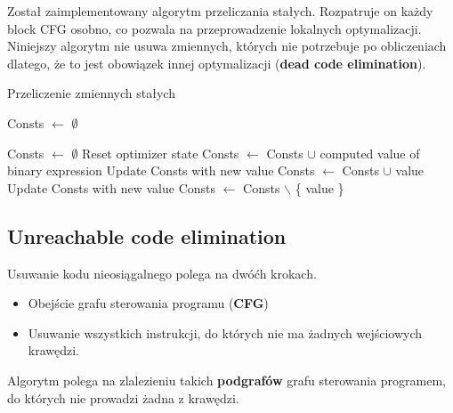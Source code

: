 \documentclass[leqno, 12pt]{article}
\newcommand{\spacing}{\vskip 0.5cm}
\begin{document}
			Został zaimplementowany algorytm przeliczania stałych. Rozpatruje on każdy block CFG osobno,
			co pozwala na przeprowadzenie lokalnych optymalizacji. Niniejszy algorytm nie usuwa zmiennych,
			których nie potrzebuje po obliczeniach dlatego, że to jest obowiązek innej optymalizacji
			(\textbf{dead code elimination}). 

			\spacing
		
			\begin{algorithm}
				\caption{Przeliczenie zmiennych stałych}
				\begin{algorithmic}[1]

					\State Consts $\gets$ $\emptyset$
					
							\State Consts $\gets$ $\emptyset$
							\Comment Reset optimizer state
						\EndIf
							\State Consts $\gets$ Consts $\cup$ computed value of binary expression
						\EndIf
									\State Update Consts with new value
								\Else
									\State Consts $\gets$ Consts $\cup$ value
								\EndIf
							\EndIf
									\State Update Consts with new value
								\Else
									\State Consts $\gets$ Consts $\backslash$ \{ value \}
								\EndIf
							\EndIf
						\EndIf
					\EndFor
				\EndProcedure

				\end{algorithmic}
			\end{algorithm}
		
		\newpage

		\subsection{Unreachable code elimination}
		
			Usuwanie kodu nieosiągalnego polega na dwóćh krokach.
			\begin{itemize}
				\item Obejście grafu sterowania programu (\textbf{CFG})
				\item Usuwanie wszystkich instrukcji, do których nie ma żadnych wejściowych krawędzi.
			\end{itemize}
			
			\spacing

			Algorytm polega na zlalezieniu takich \textbf{podgrafów} grafu sterowania programem, do których
			nie prowadzi żadna z krawędzi.
			
\end{document}
